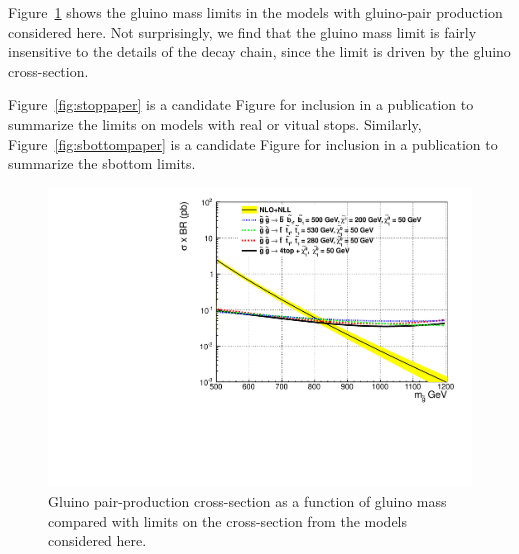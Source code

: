 Figure~\ref{fig:gluinoLimit1d} shows the gluino mass limits
in the models with gluino-pair production considered here.
Not surprisingly,
we find that the gluino mass limit is fairly insensitive 
to the details of the decay chain, since the limit
is driven by the gluino cross-section.

Figure~\ref{fig:stoppaper} is a candidate Figure for inclusion
in a publication to summarize the limits on models 
with real or vitual stops.
Similarly, Figure~\ref{fig:sbottompaper} is a candidate Figure for inclusion
in a publication to summarize the sbottom limits.



\begin{figure}[htb]
\begin{center}
\includegraphics[width=0.48\linewidth]{figs/gluino_1d.pdf}
\caption{Gluino pair-production cross-section
as a function of gluino mass compared with limits
on the cross-section from the models considered here.
\label{fig:gluinoLimit1d}}
\end{center}
\end{figure}





